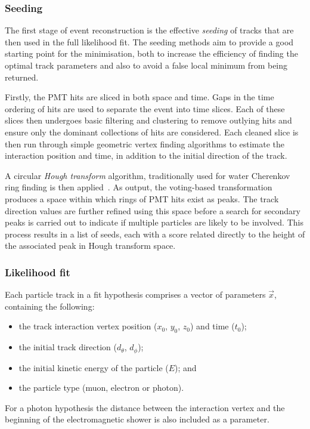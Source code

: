 \subsubsection*{Seeding} %

The first stage of event reconstruction is the effective \emph{seeding} of tracks that are then
used in the full likelihood fit. The seeding methods aim to provide a good starting point for the
minimisation, both to increase the efficiency of finding the optimal track parameters and also to
avoid a false local minimum from being returned.

Firstly, the PMT hits are sliced in both space and time. Gaps in the time ordering of hits are
used to separate the event into time slices. Each of these slices then undergoes basic filtering
and clustering to remove outlying hits and ensure only the dominant collections of hits are
considered. Each cleaned slice is then run through simple geometric vertex finding algorithms to
estimate the interaction position and time, in addition to the initial direction of the track.

A circular \emph{Hough transform} algorithm, traditionally used for water Cherenkov ring finding
is then applied~\cite{illingworth1988}. As output, the voting-based transformation produces a
space within which rings of PMT hits exist as peaks. The track direction values are further
refined using this space before a search for secondary peaks is carried out to indicate if
multiple particles are likely to be involved. This process results in a list of seeds, each with a
score related directly to the height of the associated peak in Hough transform space.

\subsubsection*{Likelihood fit} %


Each particle track in a fit hypothesis comprises a vector of parameters $\vec{x}$, containing the
following:
\begin{itemize}
    \item the track interaction vertex position ($x_{0}$, $y_{0}$, $z_{0}$) and time ($t_{0}$);
    \item the initial track direction ($d_{\theta}$, $d_{\phi}$);
    \item the initial kinetic energy of the particle ($E$); and
    \item the particle type (muon, electron or photon).
\end{itemize}
For a photon hypothesis the distance between the interaction vertex and the beginning of the
electromagnetic shower is also included as a parameter.

